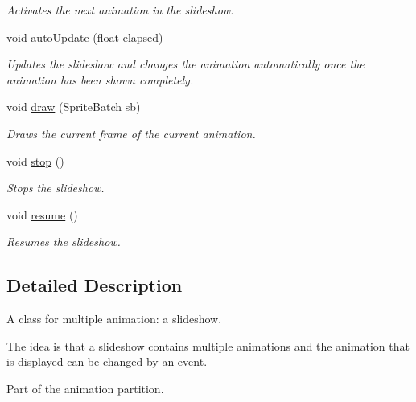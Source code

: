 \begin{DoxyCompactItemize}
\begin{DoxyCompactList}\small\item\em Activates the next animation in the slideshow. \end{DoxyCompactList}\item 
void \hyperlink{classwp__engine_1_1_slide_show_a4015703b2d7d1eb24e48059823e6cbc2}{auto\-Update} (float elapsed)
\begin{DoxyCompactList}\small\item\em Updates the slideshow and changes the animation automatically once the animation has been shown completely. \end{DoxyCompactList}\item 
void \hyperlink{classwp__engine_1_1_slide_show_ae9e09fb9ebac00528557f756de8ce0e4}{draw} (Sprite\-Batch sb)
\begin{DoxyCompactList}\small\item\em Draws the current frame of the current animation. \end{DoxyCompactList}\item 
void \hyperlink{classwp__engine_1_1_slide_show_abca02602546c159a475dc1f31836d47f}{stop} ()
\begin{DoxyCompactList}\small\item\em Stops the slideshow. \end{DoxyCompactList}\item 
void \hyperlink{classwp__engine_1_1_slide_show_a6b9e6fa9b5a79b1ed9b5097f1141ed56}{resume} ()
\begin{DoxyCompactList}\small\item\em Resumes the slideshow. \end{DoxyCompactList}\end{DoxyCompactItemize}


\subsection{Detailed Description}
A class for multiple animation\-: a slideshow. 

The idea is that a slideshow contains multiple animations and the animation that is displayed can be changed by an event.

Part of the animation partition. 

